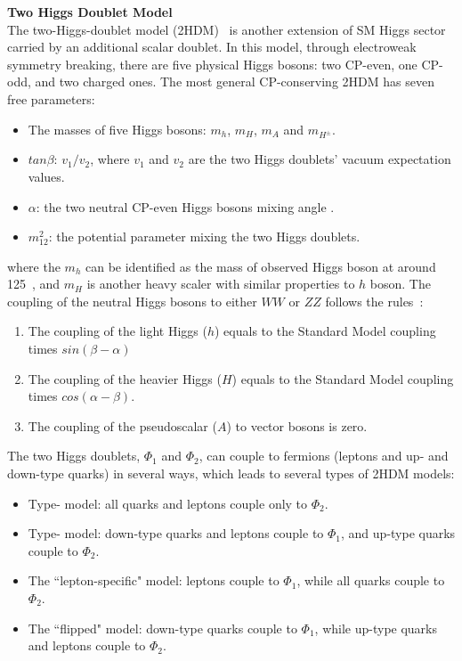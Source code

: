 \textbf{Two Higgs Doublet Model} \\
The two-Higgs-doublet model (2HDM)~\cite{BRANCO20121} is another extension of SM Higgs sector carried by an additional scalar doublet.
In this model, through electroweak symmetry breaking, there are five physical Higgs bosons: two CP-even, one CP-odd, and two charged ones.
The most general CP-conserving 2HDM has seven free parameters:
\begin{itemize}
    \item The masses of five Higgs bosons: $m_{h}$, $m_{H}$, $m_{A}$ and $m_{H^{\pm}}$.
    \item $tan \beta$: $v_1/v_2$, where $v_1$ and $v_2$ are the two Higgs doublets' vacuum expectation values.
    \item $\alpha$: the two neutral CP-even Higgs bosons mixing angle .
    \item $m_{12}^{2}$: the potential parameter mixing the two Higgs doublets.
\end{itemize}
where the $m_{h}$ can be identified as the mass of observed Higgs boson at around 125~\gev, and $m_{H}$ is another heavy scaler with similar properties to $h$ boson.
The coupling of the neutral Higgs bosons to either $WW$ or $ZZ$ follows the rules~\cite{BRANCO20121}: 
\begin{enumerate}
    \item The coupling of the light Higgs ($h$) equals to the Standard Model coupling times $sin(\beta - \alpha)$ 
    \item The coupling of the heavier Higgs ($H$) equals to the Standard Model coupling times $cos(\alpha - \beta)$.
    \item The coupling of the pseudoscalar ($A$) to vector bosons is zero.
\end{enumerate}
The two Higgs doublets, $\Phi_{1}$ and $\Phi_{2}$, can couple to fermions (leptons and up- and down-type quarks) in several ways, which leads to several types of 2HDM models:
\begin{itemize}
    \item Type-\uppercase\expandafter{} model: all quarks and leptons couple only to $\Phi_{2}$.
    \item Type-\uppercase\expandafter{} model: down-type quarks and leptons couple to $\Phi_{1}$, and up-type quarks couple to $\Phi_{2}$.
    \item The ``lepton-specific" model: leptons couple to $\Phi_{1}$, while all quarks couple to $\Phi_{2}$.
    \item The ``flipped" model: down-type quarks couple to $\Phi_{1}$, while up-type quarks and leptons couple to $\Phi_{2}$.
\end{itemize}
